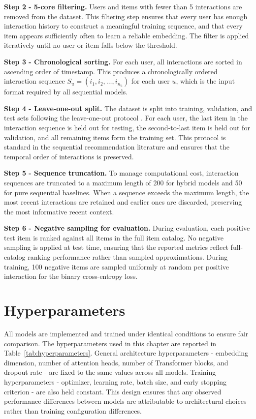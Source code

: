 \documentclass[12pt,a4paper]{report}
\begin{document}
\textbf{Step 2 - 5-core filtering.}
Users and items with fewer than 5 interactions are removed from the dataset.
This filtering step ensures that every user has enough interaction history to
construct a meaningful training sequence, and that every item appears
sufficiently often to learn a reliable embedding. The filter is applied
iteratively until no user or item falls below the threshold.

\textbf{Step 3 - Chronological sorting.}
For each user, all interactions are sorted in ascending order of timestamp.
This produces a chronologically ordered interaction sequence
\(S_u = (i_1, i_2, \ldots, i_{n_u})\) for each user \(u\), which is the
input format required by all sequential models.

\textbf{Step 4 - Leave-one-out split.}
The dataset is split into training, validation, and test sets following the
leave-one-out protocol \citep{kang2018sasrec}. For each user, the last item
in the interaction sequence is held out for testing, the second-to-last item
is held out for validation, and all remaining items form the training set.
This protocol is standard in the sequential recommendation literature and
ensures that the temporal order of interactions is preserved.

\textbf{Step 5 - Sequence truncation.}
To manage computational cost, interaction sequences are truncated to a maximum
length of 200 for hybrid models and 50 for pure sequential baselines. When a
sequence exceeds the maximum length, the most recent interactions are retained
and earlier ones are discarded, preserving the most informative recent context.

\textbf{Step 6 - Negative sampling for evaluation.}
During evaluation, each positive test item is ranked against all items in the
full item catalog. No negative sampling is applied at test time, ensuring that
the reported metrics reflect full-catalog ranking performance rather than
sampled approximations. During training, 100 negative items are sampled
uniformly at random per positive interaction for the binary cross-entropy loss.


\section{Hyperparameters}
\label{sec:hyperparameters}

All models are implemented and trained under identical conditions to ensure
fair comparison. The hyperparameters used in this chapter are reported in
Table~\ref{tab:hyperparameters}. General architecture hyperparameters -
embedding dimension, number of attention heads, number of Transformer blocks,
and dropout rate - are fixed to the same values across all models. Training
hyperparameters - optimizer, learning rate, batch size, and early stopping
criterion - are also held constant. This design ensures that any observed
performance differences between models are attributable to architectural
choices rather than training configuration differences.
\end{document}
